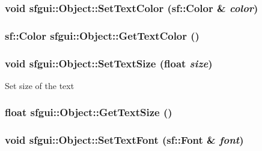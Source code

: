 \hypertarget{classsfgui_1_1Object_88f1c97f50dd466417309f0776dce452}{
\subsubsection[SetTextColor]{\setlength{\rightskip}{0pt plus 5cm}void sfgui::Object::SetTextColor (sf::Color \& {\em color})}}
\label{classsfgui_1_1Object_88f1c97f50dd466417309f0776dce452}


\hypertarget{classsfgui_1_1Object_df734af2a7ca4ad600fe8bff51ed06cc}{
\subsubsection[GetTextColor]{\setlength{\rightskip}{0pt plus 5cm}sf::Color sfgui::Object::GetTextColor ()}}
\label{classsfgui_1_1Object_df734af2a7ca4ad600fe8bff51ed06cc}


\hypertarget{classsfgui_1_1Object_01fb5dcac8bac061999ce661d13f296e}{
\subsubsection[SetTextSize]{\setlength{\rightskip}{0pt plus 5cm}void sfgui::Object::SetTextSize (float {\em size})}}
\label{classsfgui_1_1Object_01fb5dcac8bac061999ce661d13f296e}




Set size of the text \hypertarget{classsfgui_1_1Object_a6fae4cfa68982563c49b8b13b11966b}{
\subsubsection[GetTextSize]{\setlength{\rightskip}{0pt plus 5cm}float sfgui::Object::GetTextSize ()}}
\label{classsfgui_1_1Object_a6fae4cfa68982563c49b8b13b11966b}


\hypertarget{classsfgui_1_1Object_41801231361e4866d99ce7d4ef32e53d}{
\subsubsection[SetTextFont]{\setlength{\rightskip}{0pt plus 5cm}void sfgui::Object::SetTextFont (sf::Font \& {\em font})}}
\label{classsfgui_1_1Object_41801231361e4866d99ce7d4ef32e53d}




